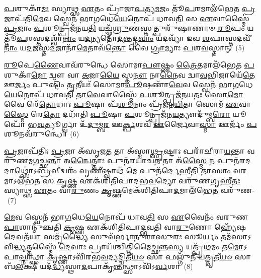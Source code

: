 \-\ul{𑌪}\-𑌶𑍁𑌕𑌾᳴\-\ul{𑌮𑌃} 𑌸𑍍𑌯𑌾𑌥𑍍𑌸 \ul{𑌏}\-𑌤𑌂 𑌪𑍍𑌰𑌾᳴𑌜𑌾\-\ul{𑌪}\-𑌤𑍍𑌯\-\ul{𑌮}\-𑌜𑌂 𑌤𑍂᳴\-\ul{𑌪}\-𑌰𑌮𑌾𑌲᳴𑌭𑍇𑌤 \ul{𑌪𑍍𑌰}\-𑌜𑌾𑌪᳴𑌤𑌿\-\ul{𑌮𑍇}\-𑌵 𑌸𑍍𑌵𑍇𑌨᳴ 𑌭𑌾\-\ul{𑌗}\-𑌧𑍇\-\ul{𑌯𑍇}\-𑌨𑍋𑌪᳴ 𑌧𑌾𑌵\-\ul{𑌤𑌿} 𑌸 \ul{𑌏}\-𑌵𑌾𑌸𑍍𑌮𑍈॑ \ul{𑌪𑍍𑌰}\-𑌜𑌾𑌂 \ul{𑌪}\-𑌶𑍂𑌨𑍍𑌪𑍍𑌰𑌜᳴𑌨𑌯\-\ul{𑌤𑌿} 𑌯𑌚𑍍𑌛𑍍𑌮᳴\-\ul{𑌶𑍍𑌰𑍁}\-𑌣𑌸𑍍𑌤𑌤𑍍𑌪𑍁𑌰𑍁᳴𑌷𑌾𑌣𑌾𑍞 \ul{𑌰𑍂}\-𑌪𑌂 𑌯𑌤𑍍𑌤𑍂᳴\-\ul{𑌪}\-𑌰𑌸𑍍𑌤𑌦𑌶𑍍𑌵𑌾᳴\-\ul{𑌨𑌾𑌂} 𑌯\-\ul{𑌦}\-𑌨𑍍𑌯𑌤𑍋᳴\-\ul{𑌦}\-𑌨𑍍𑌤𑌦𑍍𑌗\-\ul{𑌵𑌾𑌂} 𑌯𑌦𑌵𑍍𑌯𑌾᳴ 𑌇𑌵 \ul{𑌶}\-𑌫𑌾𑌸𑍍𑌤𑌦𑌵𑍀᳴\-\ul{𑌨𑌾𑌂} 𑌯\-\ul{𑌦}\-𑌜\-𑌸𑍍𑌤\-\ul{𑌦}\-𑌜𑌾𑌨𑌾᳴\-\ul{𑌮𑍇}\-𑌤𑌾𑌵᳴\-\ul{𑌨𑍍𑌤𑍋} 𑌵𑍈 \ul{𑌗𑍍𑌰𑌾}\-𑌮𑍍𑌯𑌾𑌃 \ul{𑌪}\-𑌶\-\ul{𑌵}\-𑌸𑍍𑌤𑌾𑌨𑍍~(5)

\-\ul{𑌰𑍂}\-𑌪𑍇\-\ul{𑌣𑍈}\-𑌵𑌾𑌵᳴\-𑌰𑍁𑌨𑍍𑌧𑍇 𑌸𑍋𑌮𑌾\-\ul{𑌪𑍗}\-𑌷𑍍𑌣𑌂 \ul{𑌤𑍍𑌰𑍈}\-𑌤𑌮𑌾𑌲᳴𑌭𑍇𑌤 \ul{𑌪}\-𑌶𑍁𑌕𑌾᳴\-\ul{𑌮𑍋} 𑌦𑍍𑌵𑍗 𑌵𑌾 \ul{𑌅}\-𑌜𑌾\-\ul{𑌯𑍈} 𑌸𑍍𑌤\-\ul{𑌨𑍗} 𑌨𑌾\-\ul{𑌨𑍈}\-𑌵 𑌦𑍍𑌵𑌾\-\ul{𑌵}\-𑌭𑌿𑌜𑌾𑌯𑍇᳴\-\ul{𑌤𑍇} 𑌊\-\ul{𑌰𑍍𑌜𑌂} 𑌪𑍁𑌷𑍍𑌟𑌿𑌂᳴ \ul{𑌤𑍃}\-𑌤𑍀𑌯𑌃᳴ 𑌸𑍋𑌮𑌾\-\ul{𑌪𑍂}\-𑌷𑌣𑌾᳴\-\ul{𑌵𑍇}\-𑌵 𑌸𑍍𑌵𑍇𑌨᳴ 𑌭𑌾\-\ul{𑌗}\-𑌧𑍇\-\ul{𑌯𑍇}\-𑌨𑍋𑌪᳴ 𑌧𑌾𑌵\-\ul{𑌤𑌿} 𑌤𑌾\-\ul{𑌵𑍇}\-𑌵𑌾𑌸𑍍𑌮𑍈᳴ \ul{𑌪}\-𑌶𑍂𑌨𑍍𑌪𑍍𑌰𑌜᳴𑌨𑌯\-\ul{𑌤𑌃} 𑌸𑍋\-\ul{𑌮𑍋} 𑌵𑍈 𑌰𑍇᳴\-\ul{𑌤𑍋}\-𑌧𑌾𑌃 \ul{𑌪𑍂}\-𑌷𑌾 𑌪᳴\-\ul{𑌶𑍂}\-𑌨𑌾𑌂 𑌪𑍍𑌰᳴𑌜𑌨\-\ul{𑌯𑌿}\-𑌤𑌾 𑌸𑍋𑌮᳴ \ul{𑌏}\-𑌵𑌾\-\ul{𑌸𑍍𑌮𑍈} 𑌰𑍇\-\ul{𑌤𑍋} 𑌦𑌧𑌾᳴𑌤𑌿 \ul{𑌪𑍂}\-𑌷𑌾 \ul{𑌪}\-𑌶𑍂𑌨𑍍𑌪𑍍𑌰𑌜᳴𑌨\-\ul{𑌯}\-𑌤𑍍𑌯𑍗𑌦𑍁᳴𑌮𑍍𑌬\-\ul{𑌰𑍋} 𑌯𑍂𑌪𑍋᳴ 𑌭\-\ul{𑌵}\-𑌤𑍍𑌯𑍂𑌰𑍍𑌗𑍍𑌵𑌾 𑌉᳴\-\ul{𑌦𑍁}\-𑌮𑍍𑌬\-\ul{𑌰} 𑌊\-\ul{𑌰𑍍𑌕𑍍𑌪}\-𑌶𑌵᳴ \ul{𑌊}\-𑌰𑍍𑌜𑍈𑌵𑌾\-\ul{𑌸𑍍𑌮𑌾} 𑌊𑌰𑍍𑌜𑌂᳴ \ul{𑌪}\-𑌶𑍂𑌨𑌵᳴\-𑌰𑍁𑌨𑍍𑌧𑍇॥~(6)

{\anuvakamend[{𑌭𑌵᳴\-\ul{𑌤𑍍𑌯𑍇}\-𑌵 \ul{𑌪𑍍𑌰}\-𑌜𑌾𑌯𑌾᳴ \ul{𑌆}\-𑌮𑌯᳴𑌤𑌿 \ul{𑌵𑌾}\-𑌯𑍁\-\ul{𑌮𑍇}\-𑌵 \ul{𑌨𑌿}\-𑌯𑍁𑌤𑍍𑌵᳴\-\ul{𑌨𑍍𑌤}\-\-\ul{𑍟} 𑌸𑍍𑌵𑍇𑌨᳴ 𑌭𑌾\-\ul{𑌗}\-𑌧𑍇\-\ul{𑌯𑍇}\-𑌨𑍋𑌪᳴ \ul{𑌪𑍍𑌰}\-𑌜𑌾𑌕𑌾᳴\-\ul{𑌮}\-𑌸𑍍𑌤𑌾𑌨𑍍 𑌯𑍂\-\ul{𑌪}\-𑌸𑍍𑌤𑍍𑌰𑌯𑍋᳴𑌦𑌶 𑌚।}]}

\-\ul{𑌪𑍍𑌰}\-𑌜𑌾𑌪᳴𑌤𑌿𑌃 \ul{𑌪𑍍𑌰}\-𑌜𑌾 𑌅᳴𑌸𑍃𑌜\-\ul{𑌤} 𑌤𑌾 𑌅᳴𑌸𑍍𑌮𑌾\-\ul{𑌥𑍍𑌸𑍃}\-𑌷𑍍𑌟𑌾𑌃 𑌪𑌰𑌾᳴𑌚𑍀𑌰𑌾\-\ul{𑌯}\-𑌨𑍍𑌤𑌾 𑌵𑌰𑍁᳴𑌣𑌮𑌗\-\ul{𑌚𑍍𑌛}\-𑌨𑍍𑌤𑌾 𑌅\-\ul{𑌨𑍍𑌵𑍈}\-𑌤𑍍𑌤𑌾𑌃 𑌪𑍁𑌨᳴𑌰𑌯𑌾𑌚\-\ul{𑌤} 𑌤𑌾 𑌅᳴\-\ul{𑌸𑍍𑌮𑍈} 𑌨 𑌪𑍁𑌨᳴𑌰𑌦\-\ul{𑌦𑌾}\-𑌥𑍍𑌸𑍋॑\-𑌽𑌬𑍍𑌰\-\ul{𑌵𑍀}\-𑌦𑍍𑌵𑌰𑌂᳴ 𑌵𑍃\-\ul{𑌣𑍀}\-𑌷𑍍𑌵𑌾𑌥᳴ \ul{𑌮𑍇} 𑌪𑍁𑌨᳴\-\ul{𑌰𑍍𑌦𑍇}\-𑌹𑍀\-\ul{𑌤𑌿} 𑌤𑌾\-\ul{𑌸𑌾𑌂} 𑌵\-\ul{𑌰}\-𑌮𑌾\-𑌽𑌲᳴𑌭\-\ul{𑌤} 𑌸 \ul{𑌕𑍃}\-𑌷𑍍𑌣 𑌏𑌕᳴𑌶𑌿𑌤𑌿𑌪𑌾𑌦𑌭\-\ul{𑌵}\-𑌦𑍍𑌯𑍋 𑌵𑌰𑍁᳴𑌣𑌗𑍃𑌹𑍀\-\ul{𑌤𑌃} 𑌸𑍍𑌯𑌾𑌥𑍍𑌸 \ul{𑌏}\-𑌤𑌂 𑌵𑌾᳴\-\ul{𑌰𑍁}\-𑌣𑌂 \ul{𑌕𑍃}\-𑌷𑍍𑌣𑌮𑍇𑌕᳴𑌶𑌿𑌤𑌿𑌪𑌾\-\ul{𑌦}\-𑌮𑌾\-𑌲᳴𑌭𑍇\-\ul{𑌤} 𑌵𑌰𑍁᳴𑌣-~(7)

\-\ul{𑌮𑍇}\-𑌵 𑌸𑍍𑌵𑍇𑌨᳴ 𑌭𑌾\-\ul{𑌗}\-𑌧𑍇\-\ul{𑌯𑍇}\-𑌨𑍋𑌪᳴ 𑌧𑌾𑌵\-\ul{𑌤𑌿} 𑌸 \ul{𑌏}\-𑌵𑍈𑌨𑌂᳴ 𑌵𑌰𑍁𑌣\-\ul{𑌪𑌾}\-𑌶𑌾𑌨𑍍𑌮𑍁᳴𑌞𑍍𑌚𑌤𑌿 \ul{𑌕𑍃}\-𑌷𑍍𑌣 𑌏𑌕᳴𑌶𑌿𑌤𑌿𑌪𑌾𑌦𑍍𑌭𑌵𑌤𑌿 𑌵𑌾\-\ul{𑌰𑍁}\-𑌣𑍋 𑌹𑍍𑌯𑍇᳴𑌷 \ul{𑌦𑍇}\-𑌵𑌤᳴\-\ul{𑌯𑌾} 𑌸𑌮𑍃᳴\-\ul{𑌦𑍍𑌧𑍍𑌯𑍈} 𑌸𑍁𑌵᳴𑌰𑍍𑌭𑌾𑌨𑍁𑌰𑌾\-\ul{𑌸𑍁}\-𑌰𑌃 𑌸𑍂\-\ul{𑌰𑍍𑌯𑌂} 𑌤𑌮᳴𑌸𑌾\-𑌽𑌵𑌿\-\ul{𑌦𑍍𑌧𑍍𑌯}\-𑌤𑍍𑌤𑌸𑍍𑌮𑍈᳴ \ul{𑌦𑍇}\-𑌵𑌾𑌃 𑌪𑍍𑌰𑌾𑌯᳴𑌶𑍍𑌚𑌿𑌤𑍍𑌤𑌿𑌮𑍈\-\ul{𑌚𑍍𑌛}\-𑌨𑍍𑌤\-\ul{𑌸𑍍𑌯} 𑌯𑌤𑍍𑌪𑍍𑌰᳴\-\ul{𑌥}\-𑌮𑌂 𑌤\-\ul{𑌮𑍋}\-\-𑌽𑌪𑌾\-\ul{𑌘𑍍𑌨}\-𑌨𑍍𑌥𑍍𑌸𑌾 \ul{𑌕𑍃}\-𑌷𑍍𑌣𑌾\-𑌽𑌵𑌿᳴𑌰𑌭\-\ul{𑌵}\-𑌦𑍍𑌯\-\ul{𑌦𑍍𑌦𑍍𑌵𑌿}\-𑌤𑍀\-\ul{𑌯}\-\-\ul{𑍞} 𑌸𑌾 𑌫𑌲𑍍𑌗𑍁᳴\-\ul{𑌨𑍀} 𑌯\-\ul{𑌤𑍍𑌤𑍃}\-𑌤𑍀\-\ul{𑌯}\-\-\ul{𑍞} 𑌸𑌾 𑌬᳴\-\ul{𑌲}\-𑌕𑍍𑌷𑍀 𑌯𑌦᳴\-\ul{𑌦𑍍𑌧𑍍𑌯}\-𑌸𑍍𑌥𑌾\-\ul{𑌦}\-𑌪𑌾𑌕𑍃᳴\-\ul{𑌨𑍍𑌤}\-𑌨𑍍𑌥𑍍𑌸𑌾\-𑌽𑌵𑌿᳴\-𑌽\-\ul{𑌰𑍍𑌵}\-𑌶𑌾~(8)

